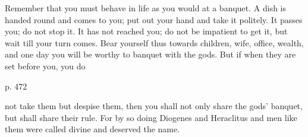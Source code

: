Remember that  you must behave  in life as  you would at  a banquet. A  dish is
handed round  and comes  to you;  put out your  hand and  take it  politely. It
passes you; do not stop it. It has  not reached you; do not be impatient to get
it, but wait  till your turn comes. Bear yourself  thus towards children, wife,
office, wealth, and one day you will be worthy to banquet with the gods. But if
when they are set before you, you do

p. 472

not take  them but  despise them,  then you  shall not  only share  the gods’
banquet, but  shall share their rule.  For by so doing  Diogenes and Heraclitus
and men like them were called divine and deserved the name.
